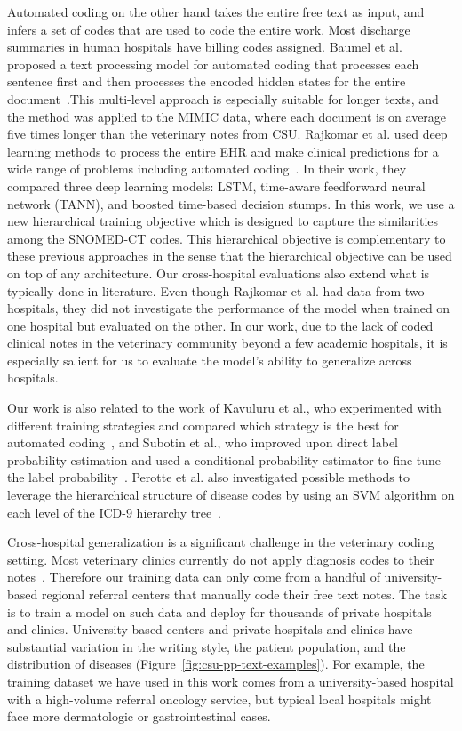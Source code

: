 \documentclass[fleqn,10pt]{wlscirep}
\begin{document}
Automated coding on the other hand takes the entire free text as input, and infers a set of codes that are used to code the entire work. Most discharge summaries in human hospitals have billing codes assigned. Baumel et al. proposed a text processing model for automated coding that processes each sentence first and then processes the encoded hidden states for the entire document~\cite{baumel2017multi}.This multi-level approach is especially suitable for longer texts, and the method was applied to the MIMIC data, where each document is on average five times longer than the veterinary notes from CSU. Rajkomar et al. used deep learning methods to process the entire EHR and make clinical predictions for a wide range of problems including automated coding~\cite{rajkomar2018scalable}. In their work, they compared three deep learning models: LSTM, time-aware feedforward neural network (TANN), and boosted time-based decision stumps. In this work, we use a new hierarchical training objective which is designed to capture the similarities among the SNOMED-CT codes. This hierarchical objective is complementary to these previous approaches in the sense that the hierarchical objective can be used on top of any architecture. Our cross-hospital evaluations also extend what is typically done in literature. Even though Rajkomar et al. had data from two hospitals, they did not investigate the performance of the model when trained on one hospital but evaluated on the other. In our work, due to the lack of coded clinical notes in the veterinary community beyond a few academic hospitals, it is especially salient for us to evaluate the model’s ability to generalize across hospitals.

Our work is also related to the work of Kavuluru et al., who experimented with different training strategies and compared which strategy is the best for automated coding~\cite{kavuluru2015empirical}, and Subotin et al., who improved upon direct label probability estimation and used a conditional probability estimator to fine-tune the label probability~\cite{subotin2016method}. Perotte et al. also investigated possible methods to leverage the hierarchical structure of disease codes by using an SVM algorithm on each level of the ICD-9 hierarchy tree~\cite{perotte2013diagnosis}.

Cross-hospital generalization is a significant challenge in the veterinary coding setting. Most veterinary clinics currently do not apply diagnosis codes to their notes~\cite{o2014approaches}. Therefore our training data can only come from a handful of university-based regional referral centers that manually code their free text notes. The task is to train a model on such data and deploy for thousands of private hospitals and clinics. University-based centers and private hospitals and clinics have substantial variation in the writing style, the patient population, and the distribution of diseases (Figure~\ref{fig:csu-pp-text-examples}). For example, the training dataset we have used in this work comes from a university-based hospital with a high-volume referral oncology service, but typical local hospitals might face more dermatologic or gastrointestinal cases.
\end{document}
